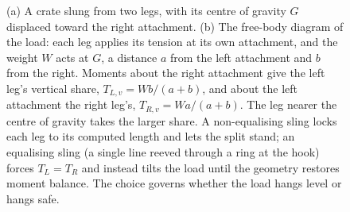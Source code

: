 \begin{figure}[htbp]
\caption[A two-leg sling on a load with an offset centre of gravity]{(a) A
crate slung from two legs, with its centre of gravity $G$ displaced toward
the right attachment. (b) The free-body diagram of the load: each leg
applies its tension at its own attachment, and the weight $W$ acts at $G$, a
distance $a$ from the left attachment and $b$ from the right. Moments about
the right attachment give the left leg's vertical share, $T_{L,v} = Wb/(a+b)$,
and about the left attachment the right leg's, $T_{R,v} = Wa/(a+b)$. The leg
nearer the centre of gravity takes the larger share. A non-equalising sling
locks each leg to its computed length and lets the split stand; an
equalising sling (a single line reeved through a ring at the hook) forces
$T_L = T_R$ and instead tilts the load until the geometry restores moment
balance. The choice governs whether the load hangs level or hangs safe.}
\label{fig:vol03ch01:sling-cg-offset}
\end{figure}
